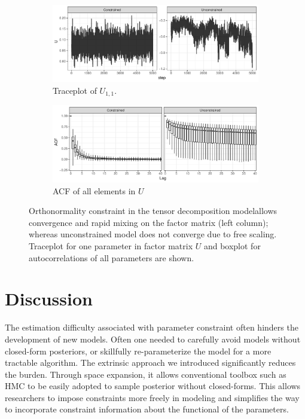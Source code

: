 \documentclass[10pt]{article}
\DeclareMathOperator{\1}{\mathbbm{1}}
\begin{document}
\begin{figure}[H]
   \begin{subfigure}[b]{1\textwidth}
    \includegraphics[width=1\textwidth]{tucker_traceplot.pdf}
    \caption{Traceplot of $U_{1,1}$.}
    \end{subfigure}
    \begin{subfigure}[b]{1\textwidth}
    \includegraphics[width=1\textwidth]{tucker_acf.pdf}
    \caption{ACF of all elements in $U$}
    \end{subfigure}
\caption{Orthonormality constraint in the tensor decomposition modelallows convergence and rapid mixing on the factor matrix (left column); whereas unconstrained model does not converge due to free scaling. Traceplot for one parameter in factor matrix $U$ and boxplot for autocorrelations of all parameters are shown.}
\label{tucker}
\end{figure}

\section{Discussion}

The estimation difficulty associated with parameter constraint often hinders the development of new models. Often one needed to carefully avoid models without closed-form posteriors, or skillfully re-parameterize the model for a more tractable algorithm. The extrinsic approach we introduced significantly reduces the burden. Through space expansion, it allows conventional toolbox such as HMC to be easily adopted to sample posterior without closed-forms. This allows researchers to impose constraints more freely in modeling and simplifies the way to incorporate constraint information about the functional of the parameters.
\end{document}
